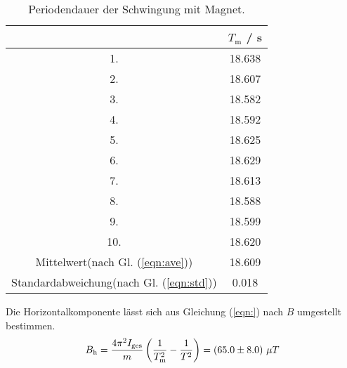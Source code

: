 \begin{table}[H] %
  \centering
  \begin{tabular}{c c}
    \toprule
    & $T_\text{m}$ / s \\
    \midrule
    1. & 18.638 \\
    2. & 18.607 \\
    3. & 18.582 \\
    4. & 18.592 \\
    5. & 18.625 \\
    6. & 18.629 \\
    7. & 18.613 \\
    8. & 18.588 \\
    9. & 18.599 \\
    10.& 18.620 \\
    \bottomrule
    Mittelwert(nach Gl. (\ref{eqn:ave})) & 18.609 \\
    Standardabweichung(nach Gl. (\ref{eqn:std})) & 0.018 \\
    \bottomrule
  \end{tabular}
  \caption{Periodendauer der Schwingung mit Magnet.}
  \label{tab:Periodendauer2}
\end{table}

Die Horizontalkomponente lässt sich aus Gleichung (\ref{eqn:}) nach $B$ umgestellt bestimmen.
\begin{equation}
  B_\text{h} = \frac{4 \pi^2 I_\text{ges}}{m} \left(\frac{1}{T_\text{m}^2} - \frac{1}{T^2} \right) = (\num{65.0 +- 8.0}) \ \mu T
\end{equation}
